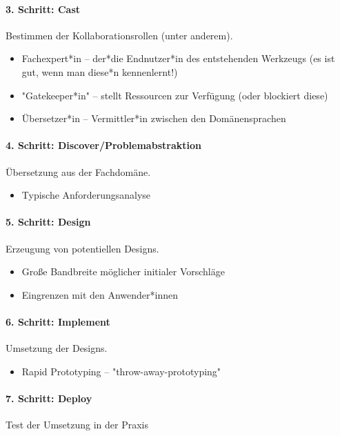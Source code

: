 \paragraph{3. Schritt: Cast}
Bestimmen der Kollaborationsrollen (unter anderem).
\begin{itemize}
	\item Fachexpert*in -- der*die Endnutzer*in des entstehenden Werkzeugs (es ist gut, wenn man diese*n kennenlernt!)
	\item "Gatekeeper*in" -- stellt Ressourcen zur Verfügung (oder blockiert diese)
	\item Übersetzer*in -- Vermittler*in zwischen den Domänensprachen
\end{itemize}

\paragraph{4. Schritt: Discover/Problemabstraktion}
Übersetzung aus der Fachdomäne.
\begin{itemize}
	\item Typische Anforderungsanalyse
\end{itemize}

\paragraph{5. Schritt: Design}
Erzeugung von potentiellen Designs.
\begin{itemize}
	\item Große Bandbreite möglicher initialer Vorschläge
	\item Eingrenzen mit den Anwender*innen
\end{itemize}

\paragraph{6. Schritt: Implement}
Umsetzung der Designs.
\begin{itemize}
	\item Rapid Prototyping -- "throw-away-prototyping"
\end{itemize}

\paragraph{7. Schritt: Deploy}
	Test der Umsetzung in der Praxis

